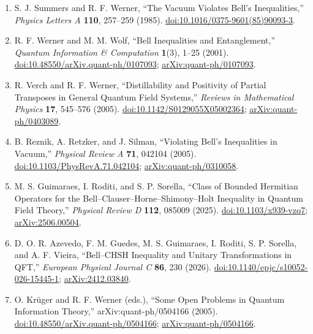 \begin{enumerate}[label={},leftmargin=4.8em,labelsep=0.5em]
  \footnotesize
  \item[\textup{[SW85]}]\label{ref:p13-summers-werner}
  S. J. Summers and R. F. Werner,
  ``The Vacuum Violates Bell's Inequalities,''
  \emph{Physics Letters A} \textbf{110}, 257--259 (1985).
  \href{https://doi.org/10.1016/0375-9601(85)90093-3}{doi:10.1016/0375-9601(85)90093-3}.

  \item[\textup{[WW01]}]\label{ref:p13-werner-wolf}
  R. F. Werner and M. M. Wolf,
  ``Bell Inequalities and Entanglement,''
  \emph{Quantum Information \& Computation} \textbf{1}(3), 1--25 (2001).
  \href{https://doi.org/10.48550/arXiv.quant-ph/0107093}{doi:10.48550/arXiv.quant-ph/0107093};
  \href{https://arxiv.org/abs/quant-ph/0107093}{arXiv:quant-ph/0107093}.

  \item[\textup{[VW05]}]\label{ref:p13-verch-werner}
  R. Verch and R. F. Werner,
  ``Distillability and Positivity of Partial Transposes in General Quantum
  Field Systems,''
  \emph{Reviews in Mathematical Physics} \textbf{17}, 545--576 (2005).
  \href{https://doi.org/10.1142/S0129055X05002364}{doi:10.1142/S0129055X05002364};
  \href{https://arxiv.org/abs/quant-ph/0403089}{arXiv:quant-ph/0403089}.

  \item[\textup{[RRS05]}]\label{ref:p13-reznik}
  B. Reznik, A. Retzker, and J. Silman,
  ``Violating Bell's Inequalities in Vacuum,''
  \emph{Physical Review A} \textbf{71}, 042104 (2005).
  \href{https://doi.org/10.1103/PhysRevA.71.042104}{doi:10.1103/PhysRevA.71.042104};
  \href{https://arxiv.org/abs/quant-ph/0310058}{arXiv:quant-ph/0310058}.

  \item[\textup{[GRS25]}]\label{ref:p13-guimaraes-et-al}
  M. S. Guimaraes, I. Roditi, and S. P. Sorella,
  ``Class of Bounded Hermitian Operators for the
  Bell--Clauser--Horne--Shimony--Holt Inequality in Quantum Field Theory,''
  \emph{Physical Review D} \textbf{112}, 085009 (2025).
  \href{https://doi.org/10.1103/x939-vzq7}{doi:10.1103/x939-vzq7};
  \href{https://arxiv.org/abs/2506.00504}{arXiv:2506.00504}.

  \item[\textup{[AGG+26]}]\label{ref:p13-azevedo-et-al}
  D. O. R. Azevedo, F. M. Guedes, M. S. Guimaraes, I. Roditi,
  S. P. Sorella, and A. F. Vieira,
  ``Bell--CHSH Inequality and Unitary Transformations in QFT,''
  \emph{European Physical Journal C} \textbf{86}, 230 (2026).
  \href{https://doi.org/10.1140/epjc/s10052-026-15445-1}{doi:10.1140/epjc/s10052-026-15445-1};
  \href{https://arxiv.org/abs/2412.03840}{arXiv:2412.03840}.

  \item[\textup{[KW05]}]\label{ref:p13-krueger-werner}
  O. Krüger and R. F. Werner (eds.),
  ``Some Open Problems in Quantum Information Theory,''
  arXiv:quant-ph/0504166 (2005).
  \href{https://doi.org/10.48550/arXiv.quant-ph/0504166}{doi:10.48550/arXiv.quant-ph/0504166};
  \href{https://arxiv.org/abs/quant-ph/0504166}{arXiv:quant-ph/0504166}.
\end{enumerate}

